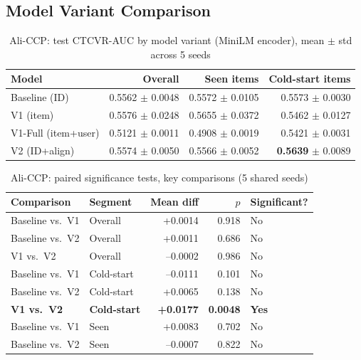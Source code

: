 \documentclass{uclthesis}
\begin{document}
\subsection{Model Variant Comparison}
\label{sec:results-aliccp-main}

\begin{table}[h]
\centering
\caption{Ali-CCP: test CTCVR-AUC by model variant (MiniLM encoder), mean $\pm$ std across 5 seeds}
\label{tab:aliccp-main}
\begin{tabular}{lrrr}
\toprule
Model & Overall & Seen items & Cold-start items \\
\midrule
Baseline (ID)  & 0.5562 $\pm$ 0.0048 & 0.5572 $\pm$ 0.0105 & 0.5573 $\pm$ 0.0030 \\
V1 (item)      & 0.5576 $\pm$ 0.0248 & 0.5655 $\pm$ 0.0372 & 0.5462 $\pm$ 0.0127 \\
V1-Full (item+user) & 0.5121 $\pm$ 0.0011 & 0.4908 $\pm$ 0.0019 & 0.5421 $\pm$ 0.0031 \\
V2 (ID+align)  & 0.5574 $\pm$ 0.0050 & 0.5566 $\pm$ 0.0052 & \textbf{0.5639} $\pm$ 0.0089 \\
\bottomrule
\end{tabular}
\end{table}

\begin{table}[h]
\centering
\caption{Ali-CCP: paired significance tests, key comparisons (5 shared seeds)}
\label{tab:aliccp-sig}
\begin{tabular}{llrrl}
\toprule
Comparison & Segment & Mean diff & $p$ & Significant? \\
\midrule
Baseline vs.\ V1 & Overall & +0.0014 & 0.918 & No \\
Baseline vs.\ V2 & Overall & +0.0011 & 0.686 & No \\
V1 vs.\ V2       & Overall & --0.0002 & 0.986 & No \\
Baseline vs.\ V1 & Cold-start & --0.0111 & 0.101 & No \\
Baseline vs.\ V2 & Cold-start & +0.0065 & 0.138 & No \\
\textbf{V1 vs.\ V2} & \textbf{Cold-start} & \textbf{+0.0177} & \textbf{0.0048} & \textbf{Yes} \\
Baseline vs.\ V1 & Seen & +0.0083 & 0.702 & No \\
Baseline vs.\ V2 & Seen & --0.0007 & 0.822 & No \\
\bottomrule
\end{tabular}
\end{table}
\end{document}
